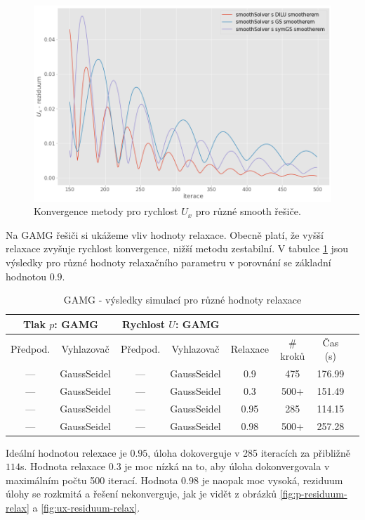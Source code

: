 \documentclass[a4paper,12pt]{report}
\theoremstyle{remark}
\begin{document}
\begin{figure}[H]
	\centering
	\includegraphics[width=1\linewidth]{ux-residuum-smooth.png}
	\caption{Konvergence metody pro rychlost $U_x$ pro různé smooth řešiče.}
	\label{fig:ux-residuum-smooth}
\end{figure}
Na GAMG řešiči si ukážeme vliv hodnoty relaxace. Obecně platí, že vyšší relaxace zvyšuje rychlost konvergence, nižší metodu zestabilní. V tabulce \ref{table:solvers_gamg_relax} jsou výsledky pro různé hodnoty relaxačního parametru v porovnání se základní hodnotou $0.9$. 
 \begin{table}[H]
	\centering
	\caption{GAMG - výsledky simulací pro různé hodnoty relaxace}
	\renewcommand{\arraystretch}{1.9}
	\begin{tabular}{*8c}
		\toprule
		\multicolumn{2}{c}{Tlak $p$: \textbf{GAMG}} & \multicolumn{2}{c}{Rychlost $U$: \textbf{GAMG}}\\		
	\midrule
	Předpod.&Vyhlazovač&Předpod.&Vyhlazovač&Relaxace&\# kroků&Čas (s)\\
	\midrule
	--- & GaussSeidel &  --- & GaussSeidel & 0.9&475&176.99\\
	--- & GaussSeidel &  --- & GaussSeidel & 0.3&500+&151.49\\
	--- & GaussSeidel &  --- & GaussSeidel & 0.95&285&114.15\\
	--- & GaussSeidel &  --- & GaussSeidel & 0.98&500+&257.28\\	
	\bottomrule
\end{tabular}
\label{table:solvers_gamg_relax}
\end{table}

Ideální hodnotou relexace je $0.95$, úloha dokoverguje v 285 iteracích za přibližně $114$s. Hodnota relaxace $0.3$ je moc nízká na to, aby úloha dokonvergovala v maximálním počtu 500 iterací.  Hodnota $0.98$ je naopak moc vysoká, reziduum úlohy se rozkmitá a řešení nekonverguje, jak je vidět z obrázků \ref{fig:p-residuum-relax} a \ref{fig:ux-residuum-relax}.
\end{document}
